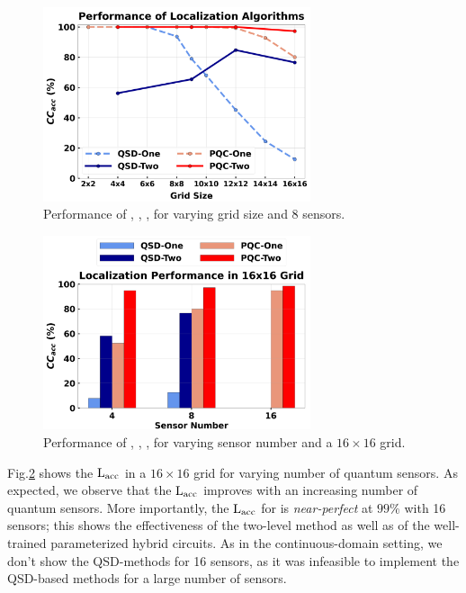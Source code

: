 \begin{figure}[ht]
    \centering
    \includegraphics[width=0.7\textwidth]{chapters/qce/figures/discrete.varygrid.png}
    \caption{Performance of \povmone, \povm, \pqcone, \pqctwo for varying grid size and 8 sensors.}
    \label{fig:discrete.varygrid}
\end{figure}


\begin{figure}[ht]
    \centering
    \includegraphics[width=0.7\textwidth]{chapters/qce/figures/discrete.varysensornum.png}
    \caption{Performance of \povmone, \povm, \pqcone, \pqctwo for varying sensor number and a $16\times16$ grid.}
    \label{fig:discrete.varysen}
\end{figure}



Fig.\ref{fig:discrete.varysen} shows the $\mathrm{L_{acc}}$ in a $16\times16$ grid for varying number of quantum sensors. As expected, we observe that the $\mathrm{L_{acc}}$ improves with an increasing number of quantum sensors. More importantly, the $\mathrm{L_{acc}}$ for \pqctwo is {\em near-perfect} 
at $99\%$ with 16 sensors; this shows the effectiveness of the two-level method as well
as of the well-trained parameterized hybrid circuits. As in the continuous-domain setting, we don't show the QSD-methods for 16 sensors, as it was infeasible to implement the QSD-based methods for a large number of sensors.
